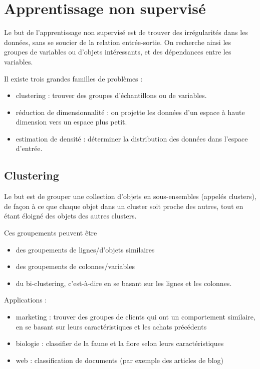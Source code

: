 \chapter{Apprentissage non supervisé}

Le but de l'apprentissage non supervisé est de trouver des irrégularités dans les données, sans se soucier de la relation entrée-sortie. On recherche ainsi les groupes de variables ou d'objets intéressants, et des dépendances entre les variables.

Il existe trois grandes familles de problèmes :

\begin{itemize}
	\item clustering : trouver des groupes d'échantillons ou de variables.
	\item réduction de dimensionnalité : on projette les données d'un espace à haute dimension vers un espace plus petit.
	\item estimation de densité : déterminer la distribution des données dans l'espace d'entrée.
\end{itemize}

\section{Clustering}

Le but est de grouper une collection d'objets en sous-ensembles (appelés clusters), de façon à ce que chaque objet dans un cluster soit proche des autres, tout en étant éloigné des objets des autres clusters.
	
Ces groupements peuvent être

\begin{itemize}
	\item des groupements de lignes/d'objets similaires
	\item des groupements de colonnes/variables
	\item du bi-clustering, c'est-à-dire en se basant sur les lignes et les colonnes.
\end{itemize}


Applications :

\begin{itemize}
	\item marketing : trouver des groupes de clients qui ont un comportement similaire, en se basant sur leurs caractéristiques et les achats précédents
	\item biologie : classifier de la faune et la flore selon leurs caractéristiques
	\item web : classification de documents (par exemple des articles de blog)
\end{itemize}

